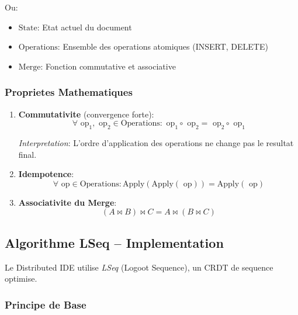 \documentclass[11pt,a4paper,hidelinks]{book}
\begin{document}
Ou:
\begin{itemize}
    \item $\text{State}$: Etat actuel du document
    \item $\text{Operations}$: Ensemble des operations atomiques (INSERT, DELETE)
    \item $\text{Merge}$: Fonction commutative et associative
\end{itemize}

\subsubsection{Proprietes Mathematiques}

\begin{enumerate}
    
    \item \textbf{Commutativite} (convergence forte):
    \begin{equation}
    \forall \text{ op}_1, \text{ op}_2 \in \text{Operations} : 
    \text{ op}_1 \circ \text{ op}_2 = \text{ op}_2 \circ \text{ op}_1
    \end{equation}
    
    \textit{Interpretation}: L'ordre d'application des operations ne change pas le resultat final.
    
    \item \textbf{Idempotence}:
    \begin{equation}
    \forall \text{ op} \in \text{Operations} : 
    \text{Apply}(\text{Apply}(\text{ op})) = \text{Apply}(\text{ op})
    \end{equation}
    
    \item \textbf{Associativite du Merge}:
    \begin{equation}
    (A \bowtie B) \bowtie C = A \bowtie (B \bowtie C)
    \end{equation}

\end{enumerate}

\subsection{Algorithme LSeq -- Implementation}

Le Distributed IDE utilise \emph{LSeq} (Logoot Sequence), un CRDT de sequence optimise.

\subsubsection{Principe de Base}
\end{document}
